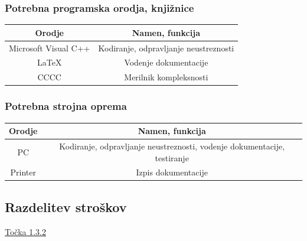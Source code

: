 \documentclass[a4paper,12pt]{article}
\begin{document}
		\subsubsection{Potrebna programska orodja, knjižnice}
			\begin{center}
			\begin{tabular}{|c|c|}
					\hline
					\rowcolor{purple!30!} Orodje& Namen, funkcija\\
					\hline
					Microsoft Visual C++& Kodiranje, odpravljanje neustreznosti\\
					\hline
					\LaTeX &Vodenje dokumentacije\\
					\hline
					CCCC& Merilnik kompleksnosti\\
					\hline
			\end{tabular}
			\end{center}

		\subsubsection{Potrebna strojna oprema}
			\begin{center}
			\begin{tabular}{|c|c|}
					\hline
					\rowcolor{purple!30!} Orodje& Namen, funkcija\\
					\hline
					PC& Kodiranje, odpravljanje neustreznosti, vodenje dokumentacije, testiranje\\
					\hline
					Printer&Izpis dokumentacije\\
					\hline	
			\end{tabular}
			\end{center}


	\subsection{Razdelitev stroškov}
		\qquad \qquad \textcolor[HTML]{C50918}{\hyperlink{subsubsection.1.3.2}{Točka 1.3.2}}

\newpage
\end{document}
